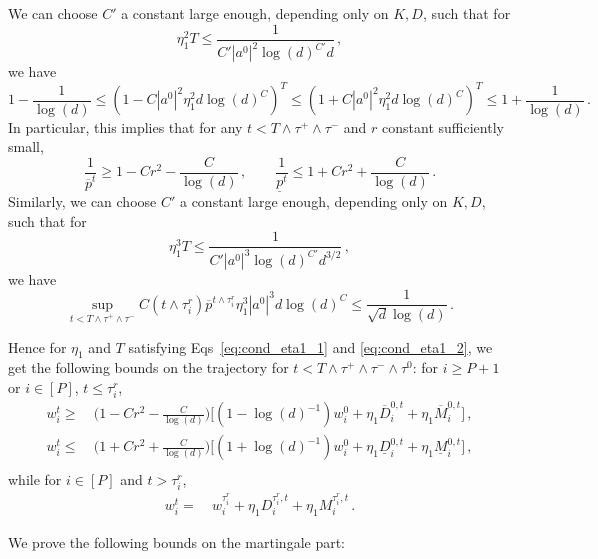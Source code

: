 \documentclass[11pt]{article}
\newcommand{\<}{\langle}
\renewcommand{\>}{\rangle}
\newcommand{\op}{{\rm op}}
\theoremstyle{definition}
\def\uD{\underline{D}}
\def\uM{\underline{M}}
\def\op{\overline{p}}
\def\up{\underline{p}}
\def\oD{\overline{D}}
\def\oM{\overline{M}}
\def\oD{\overline{D}}
\begin{document}
We can choose $C'$ a constant large enough, depending only on $K,D$, such that for
\begin{equation}\label{eq:cond_eta1_1}
\eta_1^2 T \leq \frac{1}{C' |a^0|^2 \log(d)^{C'} d}\, , 
\end{equation}
we have
\[
1 - \frac{1}{\log(d)} \leq (1 - C|a^0|^2 \eta_1^2 d \log(d)^{C} )^T \leq (1 + C|a^0|^2 \eta_1^2 d \log(d)^{C} )^T \leq 1 + \frac{1}{\log(d)} \, . 
\]
In particular, this implies that for any $t < T\wedge \tau^+ \wedge \tau^-$ and $r$ constant sufficiently small,
\begin{equation}\label{eq:opt_upt}
\frac{1}{\op^t} \geq 1 - Cr^2 - \frac{C}{\log(d)}\, , \qquad \frac{1}{\up^t} \leq 1 + Cr^2 + \frac{C}{\log(d)} \, .
\end{equation}
Similarly, we can choose $C'$ a constant large enough, depending only on $K,D$, such that for
\begin{equation}\label{eq:cond_eta1_2}
\eta_1^3 T \leq \frac{1}{C' |a^0|^3 \log(d)^{C'} d^{3/2}}\, , 
\end{equation}
we have
\[
 \sup_{t < T \wedge \tau^+ \wedge \tau^-}  C (t \wedge \tau_i^r) \op^{t \wedge \tau_i^r} \eta_1^3 |a^0|^3 d \log(d)^C \leq \frac{1}{\sqrt{d} \log(d) } \, .
\]

Hence for $\eta_1$ and $T$ satisfying Eqs~\eqref{eq:cond_eta1_1} and \eqref{eq:cond_eta1_2}, we get the following bounds on the trajectory for $t < T \wedge \tau^+ \wedge \tau^- \wedge \tau^0$: for $i \geq P+1$ or $i \in [P]$, $ t\leq \tau_i^r$,
\begin{equation}\label{eq:trajectories_w_bounds}
\begin{aligned}
w_i^t \geq&~ \Big( 1 - Cr^2 - \frac{C}{\log(d)} \Big) \Big[ (1 - \log(d)^{-1}) w_i^0 + \eta_1 \oD^{0,t}_i + \eta_1 \oM^{0,t}_i \Big] \, , \\
w_i^t \leq &~ \Big( 1 + Cr^2 + \frac{C}{\log(d)} \Big) \Big[ (1 + \log(d)^{-1}) w_i^0 + \eta_1 \uD^{0,t}_i + \eta_1 \uM^{0,t}_i  \Big] \, , \\
\end{aligned}
\end{equation}
while for $i \in [P]$ and $t > \tau_i^r$,
\begin{equation}\label{eq:traj_w_P_Delta}
\begin{aligned}
w_i^t =&~ w_i^{\tau_i^r} + \eta_1 D^{\tau_i^r,t}_i + \eta_1 M^{\tau_i^r,t}_i \, .
\end{aligned}
\end{equation}


We prove the following bounds on the martingale part:
\end{document}
